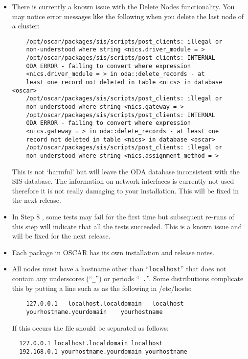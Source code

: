 \begin{itemize}

\item There is currently a known issue with the Delete Nodes functionality.
  You may notice error messages like the following when you delete the
  last node of a cluster:

  \begin{verbatim}
    /opt/oscar/packages/sis/scripts/post_clients: illegal or
    non-understood where string <nics.driver_module = >
    /opt/oscar/packages/sis/scripts/post_clients: INTERNAL
    ODA ERROR - failing to convert where expression
    <nics.driver_module = > in oda::delete_records - at
    least one record not deleted in table <nics> in database <oscar>
    /opt/oscar/packages/sis/scripts/post_clients: illegal or
    non-understood where string <nics.gateway = >
    /opt/oscar/packages/sis/scripts/post_clients: INTERNAL
    ODA ERROR - failing to convert where expression
    <nics.gateway = > in oda::delete_records - at least one
    record not deleted in table <nics> in database <oscar>
    /opt/oscar/packages/sis/scripts/post_clients: illegal or
    non-understood where string <nics.assignment_method = >
  \end{verbatim}

  This is not `harmful' but will leave the ODA database inconsistent
  with the SIS database.  The information on network interfaces is
  currently not used therefore it is not really damaging to your
  installation.  This will be fixed in the next release.

\item In Step 8 , some tests may fail for the first
  time but subsequent re-runs of this step will indicate that all the
  tests succeeded.  This is a known issue and will be fixed for the next
  release.

\item Each package in OSCAR has its own installation and release
  notes.   

\item All nodes must have a hostname other than ``{\tt localhost}''
  that does not contain any underscores (``{\tt \_}'') or periods ``{\tt
  .}''.  Some distributions complicate this by putting a line such
  as as the following in /etc/hosts:
  \begin{verbatim}
    127.0.0.1   localhost.localdomain   localhost
    yourhostname.yourdomain    yourhostname
  \end{verbatim}
  If this occurs the file should be separated as follows:
  \begin{verbatim}
  127.0.0.1 localhost.localdomain localhost
  192.168.0.1 yourhostname.yourdomain yourhostname
  \end{verbatim}


\end{itemize}
